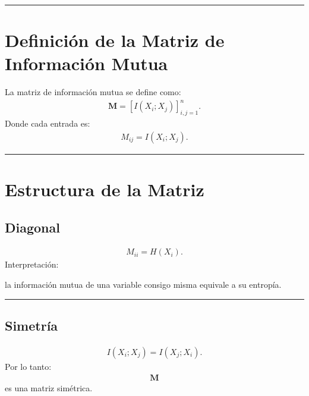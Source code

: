 \documentclass[letterpaper,10pt,english]{jupyterBook}
\begin{document}
\bigskip\hrule\bigskip



\section{Definición de la Matriz de Información Mutua}
\label{\detokenize{03_multivariate_models/mi_matrix:definicion-de-la-matriz-de-informacion-mutua}}
\sphinxAtStartPar
La matriz de información mutua se define como:
\begin{equation*}
\begin{split}
\mathbf{M} =
[I(X_i;X_j)]_{i,j=1}^n.
\end{split}
\end{equation*}
\sphinxAtStartPar
Donde cada entrada es:
\begin{equation*}
\begin{split}
M_{ij}=I(X_i;X_j).
\end{split}
\end{equation*}

\bigskip\hrule\bigskip



\section{Estructura de la Matriz}
\label{\detokenize{03_multivariate_models/mi_matrix:estructura-de-la-matriz}}

\subsection{Diagonal}
\label{\detokenize{03_multivariate_models/mi_matrix:diagonal}}\begin{equation*}
\begin{split}
M_{ii}=H(X_i).
\end{split}
\end{equation*}
\sphinxAtStartPar
Interpretación:

\sphinxAtStartPar
la información mutua de una variable consigo misma
equivale a su entropía.


\bigskip\hrule\bigskip



\subsection{Simetría}
\label{\detokenize{03_multivariate_models/mi_matrix:simetria}}\begin{equation*}
\begin{split}
I(X_i;X_j)=I(X_j;X_i).
\end{split}
\end{equation*}
\sphinxAtStartPar
Por lo tanto:
\begin{equation*}
\begin{split}
\mathbf{M}
\end{split}
\end{equation*}
\sphinxAtStartPar
es una matriz simétrica.
\end{document}
